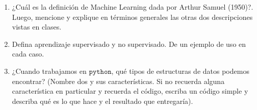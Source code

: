 \documentclass{exam}
\theoremstyle{definition}
\begin{document}
\begin{enumerate}
    \item ¿Cuál es la definición de Machine Learning dada por Arthur Samuel (1950)?. Luego, mencione y explique en términos generales las otras dos descripciones vistas en clases.
    \item Defina aprendizaje supervisado y no supervisado. De un ejemplo de uso en cada caso. 
    \item ¿Cuando trabajamos en $\mathtt{python}$, qué tipos de estructuras de datos podemos encontrar? (Nombre dos y sus características. Si no recuerda alguna característica en particular y recuerda el código, escriba un código simple y describa qué es lo que hace y el resultado que entregaría).

\end{enumerate}
\end{document}
